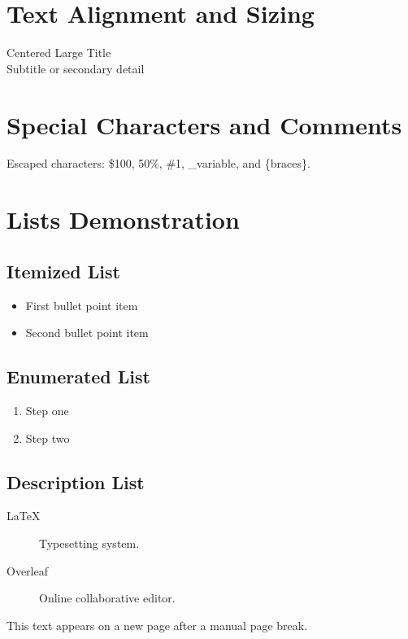 \documentclass{article}
\begin{document}
\section*{Text Alignment and Sizing}

\begin{center}
{\Huge Centered Large Title} \\
{\small Subtitle or secondary detail}
\end{center}

\section*{Special Characters and Comments}
Escaped characters: \$100, 50\%, \#1, \_variable, and \{braces\}.

\section*{Lists Demonstration}

\subsection*{Itemized List}
\begin{itemize}
    \item First bullet point item
    \item Second bullet point item
\end{itemize}

\subsection*{Enumerated List}
\begin{enumerate}
    \item Step one
    \item Step two
\end{enumerate}

\subsection*{Description List}
\begin{description}
    \item[LaTeX] Typesetting system.
    \item[Overleaf] Online collaborative editor.
\end{description}

\newpage
This text appears on a new page after a manual page break.
\end{document}
